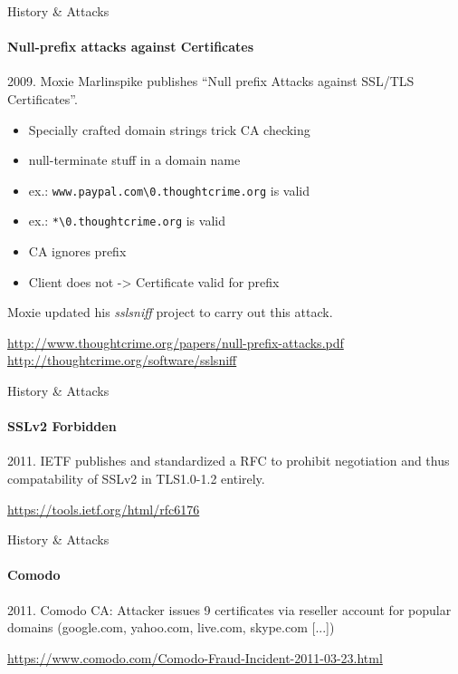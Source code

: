 \documentclass[hyperref={draft}]{beamer}
\begin{document}
\begin{frame}{History \& Attacks}
  \framesubtitle{Null-prefix attacks against Certificates}
  2009. Moxie Marlinspike publishes ``Null prefix Attacks against SSL/TLS Certificates''.

  \begin{itemize}
    \item Specially crafted domain strings trick CA checking
    \item null-terminate stuff in a domain name
    \item ex.: \texttt{www.paypal.com\textbackslash0.thoughtcrime.org} is valid
    \item ex.: \texttt{*\textbackslash0.thoughtcrime.org} is valid
    \item CA ignores prefix 
    \item Client does not -> Certificate valid for prefix
  \end{itemize}
  Moxie updated his \emph{sslsniff} project to carry out this attack.
  
  \vspace{30px}

  \tiny
  \url{http://www.thoughtcrime.org/papers/null-prefix-attacks.pdf}\\
  \url{http://thoughtcrime.org/software/sslsniff}
\end{frame}


\begin{frame}{History \& Attacks}
  \framesubtitle{SSLv2 Forbidden}
  2011. IETF publishes and standardized a RFC to prohibit negotiation and thus compatability of SSLv2 in TLS1.0-1.2 entirely. 
  
  \vspace{140px}

  \tiny
  \url{https://tools.ietf.org/html/rfc6176}
\end{frame}

\begin{frame}{History \& Attacks}
  \framesubtitle{Comodo}
  2011. Comodo CA: Attacker issues 9 certificates via reseller account for popular domains (google.com, yahoo.com, live.com, skype.com [...])
  
  \vspace{160px}

  \tiny
  \url{https://www.comodo.com/Comodo-Fraud-Incident-2011-03-23.html}
\end{frame}
\end{document}
